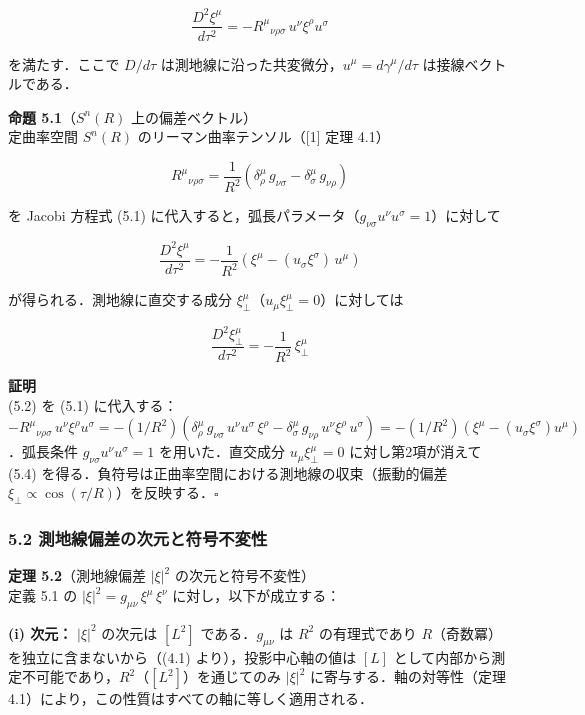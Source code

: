 \documentclass[a4paper,11pt]{ltjsarticle}
\theoremstyle{definition}
\begin{document}
\[\frac{D^2 \xi^\mu}{d\tau^2} = -R^\mu{}_{\nu\rho\sigma}\, u^\nu \xi^\rho u^\sigma \tag{5.1}\]

を満たす．ここで \(D/d\tau\) は測地線に沿った共変微分，\(u^\mu = d\gamma^\mu/d\tau\) は接線ベクトルである．

\textbf{命題 5.1}（\(S^n(R)\) 上の偏差ベクトル）\\
定曲率空間 \(S^n(R)\) のリーマン曲率テンソル（{[}1{]} 定理 4.1）

\[R^\mu{}_{\nu\rho\sigma} = \frac{1}{R^2}(\delta^\mu_\rho\, g_{\nu\sigma} - \delta^\mu_\sigma\, g_{\nu\rho}) \tag{5.2}\]

を Jacobi 方程式 (5.1) に代入すると，弧長パラメータ（\(g_{\nu\sigma}u^\nu u^\sigma = 1\)）に対して

\[\frac{D^2 \xi^\mu}{d\tau^2} = -\frac{1}{R^2}\left(\xi^\mu - (u_\sigma \xi^\sigma)\, u^\mu\right) \tag{5.3}\]

が得られる．測地線に直交する成分 \(\xi^\mu_\perp\)（\(u_\mu \xi^\mu_\perp = 0\)）に対しては

\[\frac{D^2 \xi^\mu_\perp}{d\tau^2} = -\frac{1}{R^2}\,\xi^\mu_\perp \tag{5.4}\]

\textbf{証明}\\
(5.2) を (5.1) に代入する：\(-R^\mu{}_{\nu\rho\sigma}\, u^\nu \xi^\rho u^\sigma = -(1/R^2)(\delta^\mu_\rho\, g_{\nu\sigma}\, u^\nu u^\sigma\, \xi^\rho - \delta^\mu_\sigma\, g_{\nu\rho}\, u^\nu \xi^\rho\, u^\sigma) = -(1/R^2)(\xi^\mu - (u_\sigma\xi^\sigma)u^\mu)\)．弧長条件 \(g_{\nu\sigma}u^\nu u^\sigma = 1\) を用いた．直交成分 \(u_\mu\xi^\mu_\perp = 0\) に対し第2項が消えて (5.4) を得る．負符号は正曲率空間における測地線の収束（振動的偏差 \(\xi_\perp \propto \cos(\tau/R)\)）を反映する．\(\square\)

\subsubsection{5.2 測地線偏差の次元と符号不変性}\label{ux6e2cux5730ux7ddaux504fux5deeux306eux6b21ux5143ux3068ux7b26ux53f7ux4e0dux5909ux6027}

\textbf{定理 5.2}（測地線偏差 \(|\xi|^2\) の次元と符号不変性）\\
定義 5.1 の \(|\xi|^2 = g_{\mu\nu}\,\xi^\mu\,\xi^\nu\) に対し，以下が成立する：

\textbf{(i) 次元：} \(|\xi|^2\) の次元は \([L^2]\) である．\(g_{\mu\nu}\) は \(R^2\) の有理式であり \(R\)（奇数冪）を独立に含まないから（(4.1) より），投影中心軸の値は \([L]\) として内部から測定不可能であり，\(R^2\)（\([L^2]\)）を通じてのみ \(|\xi|^2\) に寄与する．軸の対等性（定理 4.1）により，この性質はすべての軸に等しく適用される．
\end{document}
